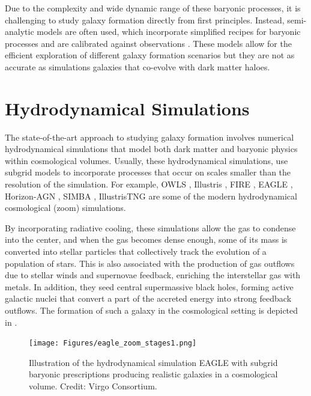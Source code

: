 Due to the complexity and wide dynamic range of these baryonic processes, it is challenging to study galaxy formation directly from first principles. Instead, semi-analytic models are often used, which incorporate simplified recipes for baryonic processes and are calibrated against observations \citep{2015ARA&A..53...51S}. These models allow for the efficient exploration of different galaxy formation scenarios but they are not as accurate as simulations galaxies that co-evolve with dark matter haloes.

\section{Hydrodynamical Simulations}

The state-of-the-art approach to studying galaxy formation involves numerical hydrodynamical simulations that model both dark matter and baryonic physics within cosmological volumes. Usually, these hydrodynamical simulations, use subgrid models to incorporate processes that occur on scales smaller than the resolution of the simulation. For example, OWLS \citep{2010MNRAS.402.1536S}, Illustris \citep{2014MNRAS.445..175G}, FIRE \citep{2014MNRAS.445..581H}, EAGLE \citep{2015MNRAS.446..521S}, Horizon-AGN \citep[][]{2017MNRAS.467.4739K}, SIMBA \citep[][]{2019MNRAS.486.2827D}, IllustrisTNG \citep{2019ComAC...6....2N} are some of the modern hydrodynamical cosmological (zoom) simulations.

By incorporating radiative cooling, these simulations allow the gas to condense into the center, and when the gas becomes dense enough, some of its mass is converted into stellar particles that collectively track the evolution of a population of stars. This is also associated with the production of gas outflows due to stellar winds and supernovae feedback, enriching the interstellar gas with metals. In addition, they seed central supermassive black holes, forming active galactic nuclei that convert a part of the accreted energy into strong feedback outflows. The formation of such a galaxy in the cosmological setting is depicted in .

\begin{figure}
\centering
\texttt{[image: Figures/eagle\_zoom\_stages1.png]}
\caption{Illustration of the hydrodynamical simulation EAGLE with subgrid baryonic prescriptions producing realistic galaxies in a cosmological volume. Credit: Virgo Consortium.}
\label{fig:illustrate-sim-eagle}
\end{figure}

